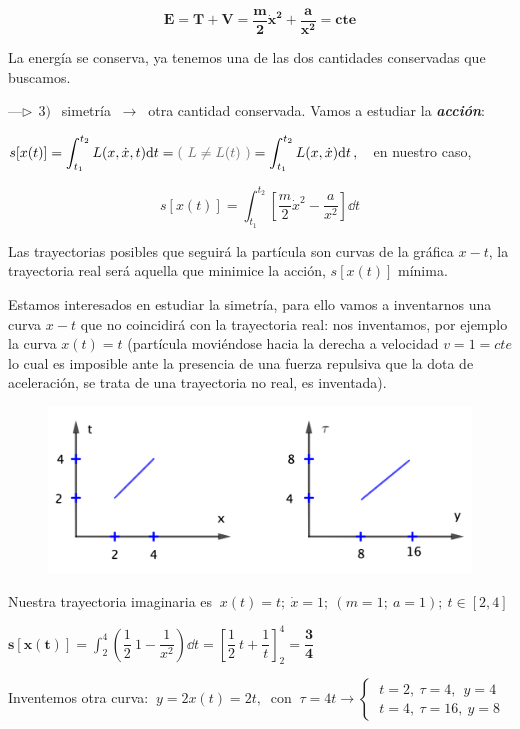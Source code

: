 $$\boldsymbol{E=T+V=\dfrac m 2 \dot x^2 + \dfrac {a}{x^2} = cte}$$

La energía se conserva, ya tenemos una de las dos cantidades conservadas que buscamos.

\vspace{5mm} ---$\triangleright\ \ 3)\ \ $ simetría $\ \to \ $ otra cantidad conservada. Vamos a estudiar la \emph{\textbf{acción}}:

$s[x(t)]=\displaystyle \int_{t_1}^{t_2} L(x, \dot x, t) \dd t = \textcolor{gris}{(\ L\neq L(t) \ )} = \int_{t_1}^{t_2} L(x, \dot x) \dd t \, , \ \ $ en nuestro caso,

\begin{equation}
\label{T14accion1}
s[x(t)] \displaystyle  = 
\int_{t_1}^{t_2} \left[ \dfrac m 2 \dot x^2 - \dfrac a{x^2} \right]  \dd t
\end{equation}

Las trayectorias posibles que seguirá la partícula son curvas de la gráfica $x-t$, la trayectoria real será aquella que minimice la acción, $s[x(t)]$ mínima.

Estamos interesados en estudiar la simetría, para ello vamos a inventarnos una curva $x-t$ que no coincidirá con la trayectoria real: nos inventamos, por ejemplo la curva $x(t)=t$ \textcolor{gris}{(partícula moviéndose hacia la derecha a velocidad $v=1=cte$ lo cual es imposible ante la presencia de una fuerza repulsiva que la dota de aceleración, se trata de una trayectoria no real, es inventada)}.


\begin{figure}[H]
	\centering
	\includegraphics[width=.75\textwidth]{imagenes/img14-03.png}
\end{figure}


Nuestra trayectoria imaginaria es $\ x(t)=t;\ \dot x=1;\ (m=1; \ a=1); \ t\in[2,4]$

$\boldsymbol{ s[x(t)]=}\displaystyle \int_2^4 \left( \dfrac 1 2 \ 1 - \dfrac 1 {x^2} \right) \dd t =   \left[ \dfrac 1 2 \ t + \dfrac 1 t \right]_2^4  \boldsymbol{ =\dfrac 3 4 }$

Inventemos otra curva: $\ y=2x(t)=2t, \ $ con $\ \tau = 4t \to \begin{cases}
 	\ t=2,\ \tau=4,\ \ y=4 \\ \ t=4,\ \tau=16,\ y=8
 \end{cases}$
 
